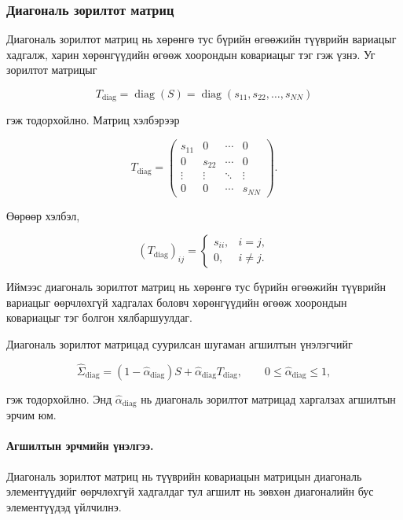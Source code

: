 \subsubsection{Диагональ зорилтот матриц}

Диагональ зорилтот матриц нь хөрөнгө тус бүрийн өгөөжийн
түүврийн вариацыг хадгалж, харин хөрөнгүүдийн өгөөж хоорондын
ковариацыг тэг гэж үзнэ. Уг зорилтот матрицыг

\[
T_{\mathrm{diag}}
=
\operatorname{diag}(S)
=
\operatorname{diag}
(s_{11},s_{22},\ldots,s_{NN})
\]

гэж тодорхойлно. Матриц хэлбэрээр

\[
T_{\mathrm{diag}}
=
\begin{pmatrix}
	s_{11} & 0      & \cdots & 0\\
	0      & s_{22} & \cdots & 0\\
	\vdots & \vdots & \ddots & \vdots\\
	0      & 0      & \cdots & s_{NN}
\end{pmatrix}.
\]

Өөрөөр хэлбэл,

\[
(T_{\mathrm{diag}})_{ij}
=
\begin{cases}
	s_{ii}, & i=j,\\
	0,      & i\neq j.
\end{cases}
\]

Иймээс диагональ зорилтот матриц нь хөрөнгө тус бүрийн
өгөөжийн түүврийн вариацыг өөрчлөхгүй хадгалах боловч
хөрөнгүүдийн өгөөж хоорондын ковариацыг тэг болгон
хялбаршуулдаг.

Диагональ зорилтот матрицад суурилсан шугаман агшилтын
үнэлэгчийг

\[
\widehat{\Sigma}_{\mathrm{diag}}
=
(1-\widehat{\alpha}_{\mathrm{diag}})S
+
\widehat{\alpha}_{\mathrm{diag}}T_{\mathrm{diag}},
\qquad
0\leq\widehat{\alpha}_{\mathrm{diag}}\leq1,
\]

гэж тодорхойлно. Энд
$\widehat{\alpha}_{\mathrm{diag}}$ нь диагональ зорилтот
матрицад харгалзах агшилтын эрчим юм.



\paragraph{Агшилтын эрчмийн үнэлгээ.}

Диагональ зорилтот матриц нь түүврийн ковариацын
матрицын диагональ элементүүдийг өөрчлөхгүй
хадгалдаг тул агшилт нь зөвхөн диагоналийн бус
элементүүдэд үйлчилнэ.


